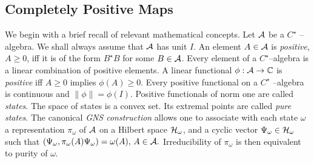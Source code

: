 \documentclass[12pt]{article}
\def\complex{{\mathbb C}}
\begin{document}
\subsection{Completely Positive Maps}
We begin with a brief recall of relevant mathematical concepts.  
Let ${\cal A}$ be a $C^{\star}$ -- algebra.  We shall always assume that $
{\cal A}$ has unit $I$.  An element $A\in {\cal A}$ is {\em positive},  $A\geq 0$, 
iff it is of the form $B^\star B$ for some $B\in {\cal A}$.  Every element of
a $C^{\star}$--algebra is a linear combination of positive elements.  A
linear functional $\phi :  {\cal A} \rightarrow \complex$ is {\em positive} iff 
$A\geq 0$
implies $\phi  (A) \geq 0$.  Every positive functional on a $C^{\star}$
--algebra is continuous and $\| \phi\| = \phi  (I). $ Positive functionals of
norm one are called {\em states}.  The space of states is a convex set.  Its
extremal points are called {\em pure states}.  The canonical
 {\em GNS construction}
allows one to associate with each state $\omega$ a representation $
\pi_\omega $ of ${\cal A}$ on a Hilbert space ${\cal H}_\omega$,  and a
cyclic vector $\Psi_\omega\in{\cal H}_\omega$ such that $ (\Psi_\omega
, \pi_\omega  (A)\Psi_\omega ) = \omega  (A) , \,  A\in {\cal A} . $
Irreducibility of $\pi_\omega$ is then equivalent to purity of $\omega . $
\end{document}
